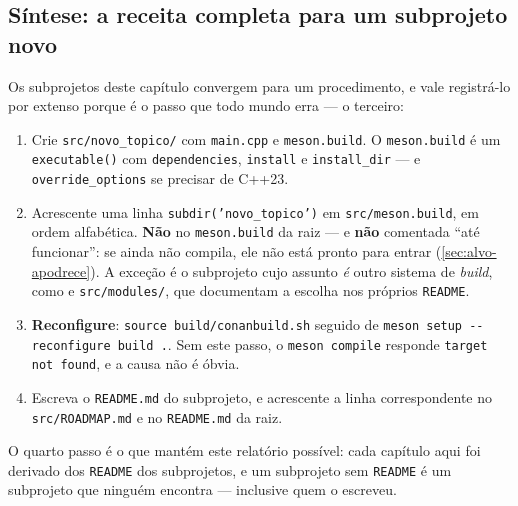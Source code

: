 \subsection{Síntese: a receita completa para um subprojeto novo}

Os subprojetos deste capítulo convergem para um procedimento, e vale
registrá-lo por extenso porque é o passo que todo mundo erra --- o terceiro:

\begin{enumerate}
    \item Crie \texttt{src/novo\_topico/} com \texttt{main.cpp} e
          \texttt{meson.build}. O \texttt{meson.build} é um
          \texttt{executable()} com \texttt{dependencies}, \texttt{install} e
          \texttt{install\_dir} --- e \texttt{override\_options} se precisar de
          C++23.
    \item Acrescente uma linha \texttt{subdir('novo\_topico')} em
          \texttt{src/meson.build}, em ordem alfabética. \textbf{Não} no
          \texttt{meson.build} da raiz --- e \textbf{não} comentada
          ``até funcionar'': se ainda não compila, ele não está pronto para
          entrar (\cref{sec:alvo-apodrece}). A exceção é o subprojeto cujo
          assunto \emph{é} outro sistema de \emph{build}, como
           e \texttt{src/modules/}, que documentam a escolha
          nos próprios \texttt{README}.
    \item \textbf{Reconfigure}: \texttt{source build/conanbuild.sh} seguido de
          \texttt{meson setup -{}-reconfigure build .}. Sem este passo, o
          \texttt{meson compile} responde \texttt{target not found}, e a causa
          não é óbvia.
    \item Escreva o \texttt{README.md} do subprojeto, e acrescente a linha
          correspondente no \texttt{src/ROADMAP.md} e no \texttt{README.md} da
          raiz.
\end{enumerate}

O quarto passo é o que mantém este relatório possível: cada capítulo aqui foi
derivado dos \texttt{README} dos subprojetos, e um subprojeto sem
\texttt{README} é um subprojeto que ninguém encontra --- inclusive quem o
escreveu.
